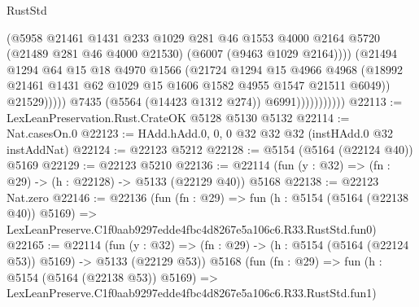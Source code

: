 \begin{lexlean}{RustStd}
\begin{coremodule}
                                    (@5958
                                      @21461
                                      @1431
                                      @233
                                      @1029
                                      @281
                                      @46
                                      @1553
                                      @4000
                                      @2164
                                      @5720
                                      (@21489 @281 @46 @4000 @21530)
                                      (@6007 (@9463 @1029 @2164))))
                                  (@21494
                                    @1294
                                    @64
                                    @15
                                    @18
                                    @4970
                                    @1566
                                    (@21724
                                      @1294
                                      @15
                                      @4966
                                      @4968
                                      (@18992
                                        @21461
                                        @1431
                                        @62
                                        @1029
                                        @15
                                        @1606
                                        @1582
                                        @4955
                                        @1547
                                        @21511
                                        @6049))
                                    @21529)))))
                          @7435
                          (@5564 (@14423 @1312 @274))
                          @6991)))))))))))
@22113 := LexLeanPreservation.Rust.CrateOK @5128 @5130 @5132
@22114 := Nat.casesOn.{0}
@22123 := HAdd.hAdd.{0, 0, 0} @32 @32 @32 (instHAdd.{0} @32 instAddNat)
@22124 := @22123 @5212
@22128 := @5154 (@5164 (@22124 @40)) @5169
@22129 := @22123 @5210
@22136 := @22114 (fun (y : @32) => (fn : @29) -> (h : @22128) -> @5133 (@22129 @40)) @5168
@22138 := @22123 Nat.zero
@22146 := @22136
    (fun (fn : @29) =>
    fun (h : @5154 (@5164 (@22138 @40)) @5169) =>
    LexLeanPreserve.C1f0aab9297edde4fbc4d8267e5a106c6.R33.RustStd.fun0)
@22165 := @22114
    (fun (y : @32) => (fn : @29) -> (h : @5154 (@5164 (@22124 @53)) @5169) -> @5133 (@22129 @53))
    @5168
    (fun (fn : @29) =>
    fun (h : @5154 (@5164 (@22138 @53)) @5169) =>
    LexLeanPreserve.C1f0aab9297edde4fbc4d8267e5a106c6.R33.RustStd.fun1)

\end{coremodule}
\end{lexlean}
